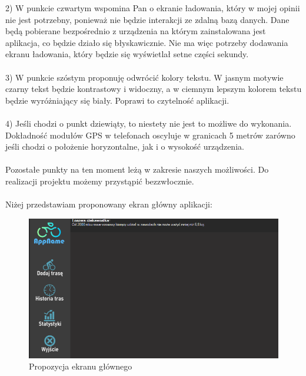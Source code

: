 {2) W punkcie czwartym wspomina Pan o ekranie ładowania, który w mojej opinii nie jest potrzebny, ponieważ nie będzie interakcji ze zdalną bazą danych. Dane będą pobierane bezpośrednio z urządzenia na którym zainstalowana jest aplikacja, co będzie działo się błyskawicznie. Nie ma więc potrzeby dodawania ekranu ładowania, który będzie się wyświetlał setne części sekundy. \\\\
3) W punkcie szóstym proponuję odwrócić kolory tekstu. W jasnym motywie czarny tekst będzie kontrastowy i widoczny, a w ciemnym lepszym kolorem tekstu będzie wyróżniający się biały. Poprawi to czytelność aplikacji. \\\\
4) Jeśli chodzi o punkt dziewiąty, to niestety nie jest to możliwe do wykonania. Dokładność modułów GPS w telefonach oscyluje w granicach 5 metrów zarówno jeśli chodzi o położenie horyzontalne, jak i o wysokość urządzenia. \\\\
Pozostałe punkty na ten moment leżą w zakresie naszych możliwości. Do realizacji projektu możemy przystąpić bezzwłocznie. \\\\
Niżej przedstawiam proponowany ekran główny aplikacji:
}


	\begin{figure}[!htb]
	\begin{center}
		\includegraphics[width=15cm]{rys/main_screen.png}
		\caption{Propozycja ekranu głównego}
		\label{rys:Propozycja ekranu głównego}
	\end{center}
\end{figure}


